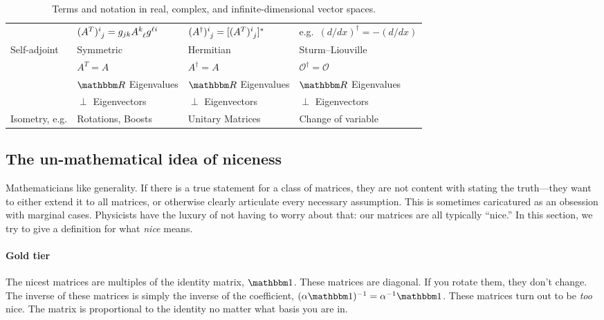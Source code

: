 \documentclass[12pt]{article}
\begin{document}
\begin{table}
\begin{tabular}{ @{} llll @{} }
            & $(A^T)\aij{i}{j} = g_{jk}A\aij{k}{\ell}g^{\ell i}$
            & $(A^\dag)\aij{i}{j}= [(A^T)\aij{i}{j}]^*$
            & e.g.~$(d/dx)^\dag = -(d/dx)$
        \\
        Self-adjoint
            & Symmetric
            & Hermitian
            & Sturm--Liouville
        \\
            & $A^T = A$
            & $A^\dag = A$
            & $\mathcal O^\dag = \mathcal O$
        \\
            & $\RR$ Eigenvalues
            & $\RR$ Eigenvalues
            & $\RR$ Eigenvalues
        \\
            & $\perp$ Eigenvectors
            & $\perp$ Eigenvectors
            & $\perp$ Eigenvectors
        \\
        Isometry, e.g.
            & Rotations, Boosts
            & Unitary Matrices
            & Change of variable
        \\ \bottomrule
    \end{tabular}
    \caption{
        Terms and notation in real, complex, and infinite-dimensional vector spaces. 
        \label{table:vectors:numbers}
  }
\end{table}

\subsection{The un-mathematical idea of niceness}
\label{sec:nice}

Mathematicians like generality. If there is a true statement for a class of matrices, they are not content with stating the truth---they want to either extend it to all matrices, or otherwise clearly articulate every necessary assumption. This is sometimes caricatured as an obsession with marginal cases. Physicists have the luxury of not having to worry about that: our matrices are all typically ``nice.'' In this section, we try to give a definition for what \emph{nice} means. 

\paragraph{Gold tier} The nicest matrices are multiples of the identity matrix, $\one$. These matrices are diagonal. If you rotate them, they don't change. The inverse of these matrices is simply the inverse of the coefficient, $(\alpha \one)^{-1} = \alpha^{-1} \one$. These matrices turn out to be \emph{too} nice. The matrix is proportional to the identity no matter what basis you are in.
\end{document}
